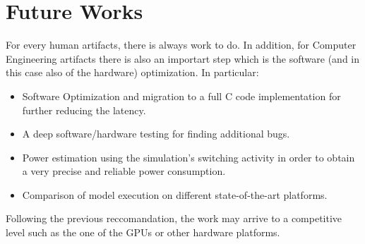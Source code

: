 \section{Future Works}
For every human artifacts, there is always work to do. In addition, for Computer Engineering artifacts there is also an importart step which is the software (and in this case also of the hardware) optimization.
In particular:

\begin{itemize} 
\item Software Optimization and migration to a full C code implementation for further reducing the latency.
\item A deep software/hardware testing for finding additional bugs.
\item Power estimation using the simulation’s switching activity in order to obtain a very precise and reliable power consumption.
\item Comparison of model execution on different state-of-the-art platforms.\\
\end{itemize}

Following the previous reccomandation, the work may arrive to a competitive level such as the one of the GPUs or other hardware platforms.

